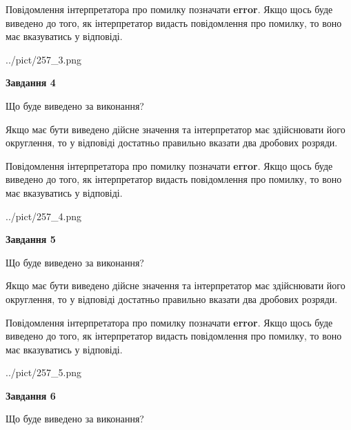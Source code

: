 \documentclass[12pt, ukrainian]{article}
\begin{document}
{\begin {Large}
Повідомлення інтерпретатора про помилку позначати \textbf{error}.
Якщо щось буде виведено до того, як інтерпретатор видасть повідомлення про помилку, 
то воно має вказуватись у відповіді. \par

\begin{center}
	{../pict/257_3.png}
\end{center}
\newpage

{\begin {center}\textbf{Завдання 4}\end {center}}\par
Що буде виведено за виконання? \par

Якщо має бути виведено дійсне значення та інтерпретатор має здійснювати його округлення, 
то у відповіді достатньо правильно вказати два дробових розряди.

Повідомлення інтерпретатора про помилку позначати \textbf{error}.
Якщо щось буде виведено до того, як інтерпретатор видасть повідомлення про помилку, 
то воно має вказуватись у відповіді. \par

\begin{center}
	{../pict/257_4.png}
\end{center}
\newpage

{\begin {center}\textbf{Завдання 5}\end {center}}\par
Що буде виведено за виконання? \par

Якщо має бути виведено дійсне значення та інтерпретатор має здійснювати його округлення, 
то у відповіді достатньо правильно вказати два дробових розряди.

Повідомлення інтерпретатора про помилку позначати \textbf{error}.
Якщо щось буде виведено до того, як інтерпретатор видасть повідомлення про помилку, 
то воно має вказуватись у відповіді. \par

\begin{center}
	{../pict/257_5.png}
\end{center}
\newpage

{\begin {center}\textbf{Завдання 6}\end {center}}\par
Що буде виведено за виконання? \par


\end{Large}}
\end{document}
